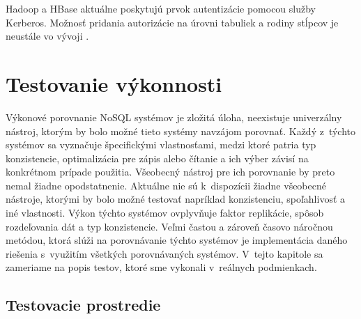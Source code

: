 \documentclass[11pt,twoside,a4paper]{book}
\begin{document}
Hadoop a HBase aktuálne poskytujú prvok autentizácie pomocou služby Kerberos. Možnosť pridania autorizácie na úrovni tabuliek a rodiny stĺpcov je neustále vo vývoji \cite{hbaseSec}. 


% 
% 



% 
% 
% 
% 
% 
% 
% 


\chapter{Testovanie výkonnosti}
\label{chapter:testovanie}

Výkonové porovnanie NoSQL systémov je zložitá úloha, neexistuje univerzálny nástroj, ktorým by bolo možné tieto systémy navzájom porovnať. 
Každý z~týchto systémov sa vyznačuje špecifickými vlastnosťami, medzi ktoré patria typ konzistencie, optimalizácia pre zápis alebo čítanie a ich výber závisí na konkrétnom prípade použitia. Všeobecný nástroj pre ich porovnanie by preto nemal žiadne opodstatnenie. Aktuálne nie sú k~dispozícii žiadne všeobecné nástroje, ktorými by bolo možné testovať napríklad konzistenciu, spoľahlivosť a iné vlastnosti. Výkon týchto systémov ovplyvňuje faktor replikácie, spôsob rozdeľovania dát a typ konzistencie. Veľmi častou a zároveň časovo náročnou metódou, ktorá slúži na porovnávanie týchto systémov je implementácia daného riešenia s~využitím všetkých porovnávaných systémov. V~tejto kapitole sa zameriame na popis testov, ktoré sme vykonali v~reálnych podmienkach.



\section{Testovacie prostredie}
\end{document}
